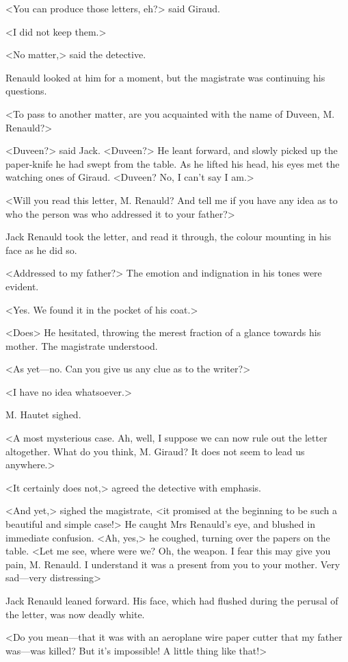  <You can produce those letters, eh?> said Giraud. 

 <I did not keep them.> 

 <No matter,> said the detective. 

 Renauld looked at him for a moment, but the magistrate was continuing his questions. 

 <To pass to another matter, are you acquainted with the name of Duveen, M. Renauld?> 

 <Duveen?> said Jack. <Duveen?> He leant forward, and slowly picked up the paper-knife he had swept from the table. As he lifted his head, his eyes met the watching ones of Giraud. <Duveen? No, I can't say I am.> 

 <Will you read this letter, M. Renauld? And tell me if you have any idea as to who the person was who addressed it to your father?> 

 Jack Renauld took the letter, and read it through, the colour mounting in his face as he did so. 

 <Addressed to my father?> The emotion and indignation in his tones were evident. 

 <Yes. We found it in the pocket of his coat.> 

 <Does\longdash> He hesitated, throwing the merest fraction of a glance towards his mother. The magistrate understood. 

 <As yet—no. Can you give us any clue as to the writer?> 

 <I have no idea whatsoever.> 

 M. Hautet sighed. 

 <A most mysterious case. Ah, well, I suppose we can now rule out the letter altogether. What do you think, M. Giraud? It does not seem to lead us anywhere.> 

 <It certainly does not,> agreed the detective with emphasis. 

 <And yet,> sighed the magistrate, <it promised at the beginning to be such a beautiful and simple case!> He caught Mrs Renauld's eye, and blushed in immediate confusion. <Ah, yes,> he coughed, turning over the papers on the table. <Let me see, where were we? Oh, the weapon. I fear this may give you pain, M. Renauld. I understand it was a present from you to your mother. Very sad—very distressing\longdash> 

 Jack Renauld leaned forward. His face, which had flushed during the perusal of the letter, was now deadly white. 

 <Do you mean—that it was with an aeroplane wire paper cutter that my father was—was killed? But it's impossible! A little thing like that!> 

